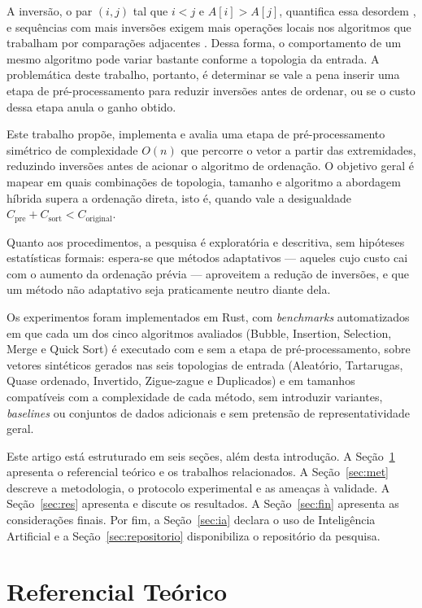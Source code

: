 \documentclass[12pt]{article}
\begin{document}
A inversão, o par $(i,j)$ tal que $i<j$ e $A[i]>A[j]$, quantifica essa desordem \cite{knuth_art_1973, mannila_measures_1984}, e sequências com mais inversões exigem mais operações locais nos algoritmos que trabalham por comparações adjacentes \cite{mannila_measures_1984}. Dessa forma, o comportamento de um mesmo algoritmo pode variar bastante conforme a topologia da entrada. A problemática deste trabalho, portanto, é determinar se vale a pena inserir uma etapa de pré-processamento para reduzir inversões antes de ordenar, ou se o custo dessa etapa anula o ganho obtido.

Este trabalho propõe, implementa e avalia uma etapa de pré-processamento simétrico de complexidade $O(n)$ que percorre o vetor a partir das extremidades, reduzindo inversões antes de acionar o algoritmo de ordenação. O objetivo geral é mapear em quais combinações de topologia, tamanho e algoritmo a abordagem híbrida supera a ordenação direta, isto é, quando vale a desigualdade $C_{\text{pre}}+C_{\text{sort}}<C_{\text{original}}$.

Quanto aos procedimentos, a pesquisa é exploratória e descritiva, sem hipóteses estatísticas formais: espera-se que métodos adaptativos --- aqueles cujo custo cai com o aumento da ordenação prévia --- aproveitem a redução de inversões, e que um método não adaptativo seja praticamente neutro diante dela.

Os experimentos foram implementados em Rust, com \emph{benchmarks} automatizados em que cada um dos cinco algoritmos avaliados (Bubble, Insertion, Selection, Merge e Quick Sort) é executado com e sem a etapa de pré-processamento, sobre vetores sintéticos gerados nas seis topologias de entrada (Aleatório, Tartarugas, Quase ordenado, Invertido, Zigue-zague e Duplicados) e em tamanhos compatíveis com a complexidade de cada método, sem introduzir variantes, \emph{baselines} ou conjuntos de dados adicionais e sem pretensão de representatividade geral.

Este artigo está estruturado em seis seções, além desta introdução. A Seção~\ref{sec:fund} apresenta o referencial teórico e os trabalhos relacionados. A Seção~\ref{sec:met} descreve a metodologia, o protocolo experimental e as ameaças à validade. A Seção~\ref{sec:res} apresenta e discute os resultados. A Seção~\ref{sec:fin} apresenta as considerações finais. Por fim, a Seção~\ref{sec:ia} declara o uso de Inteligência Artificial e a Seção~\ref{sec:repositorio} disponibiliza o repositório da pesquisa.

\section{Referencial Teórico}\label{sec:fund}
\end{document}
